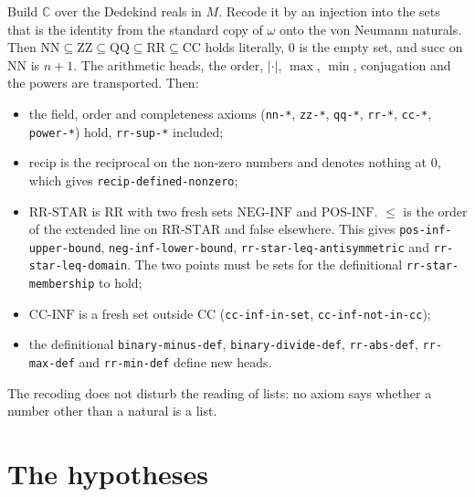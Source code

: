 Build $\mathbb{C}$ over the Dedekind reals in $M$.  Recode it by an
injection into the sets that is the identity from the standard copy of
$\omega$ onto the von Neumann naturals.  Then
$\mathrm{NN}\subseteq\mathrm{ZZ}\subseteq\mathrm{QQ}\subseteq\mathrm{RR}\subseteq\mathrm{CC}$
holds literally, $0$ is the empty set, and $\mathrm{succ}$ on
$\mathrm{NN}$ is $n+1$.  The arithmetic heads, the order, $|\cdot|$,
$\max$, $\min$, conjugation and the powers are transported.  Then:
\begin{itemize}
\item the field, order and completeness axioms (\texttt{nn-*},
  \texttt{zz-*}, \texttt{qq-*}, \texttt{rr-*}, \texttt{cc-*},
  \texttt{power-*}) hold, \texttt{rr-sup-*} included;
\item $\mathrm{recip}$ is the reciprocal on the non-zero numbers and
  denotes nothing at $0$, which gives \texttt{recip-defined-nonzero};
\item $\mathrm{RR\text{-}STAR}$ is $\mathrm{RR}$ with two fresh sets
  $\mathrm{NEG\text{-}INF}$ and $\mathrm{POS\text{-}INF}$.  $\leq$ is the
  order of the extended line on $\mathrm{RR\text{-}STAR}$ and false
  elsewhere.  This gives \texttt{pos-inf-upper-bound},
  \texttt{neg-inf-lower-bound}, \texttt{rr-star-leq-antisymmetric} and
  \texttt{rr-star-leq-domain}.  The two points must be sets for the
  definitional \texttt{rr-star-membership} to hold;
\item $\mathrm{CC\text{-}INF}$ is a fresh set outside $\mathrm{CC}$
  (\texttt{cc-inf-in-set}, \texttt{cc-inf-not-in-cc});
\item the definitional \texttt{binary-minus-def},
  \texttt{binary-divide-def}, \texttt{rr-abs-def}, \texttt{rr-max-def}
  and \texttt{rr-min-def} define new heads.
\end{itemize}
The recoding does not disturb the reading of lists: no axiom says
whether a number other than a natural is a list.

\section{The hypotheses}\label{sec:meta-sound-hyp}

